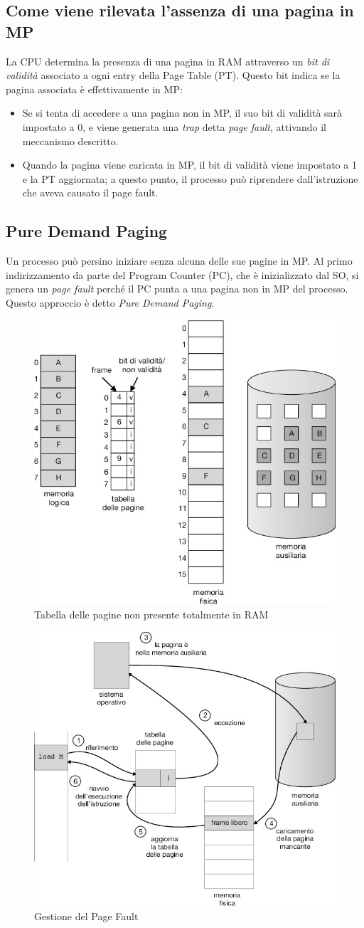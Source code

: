 \subsection*{Come viene rilevata l'assenza di una pagina in MP}
La CPU determina la presenza di una pagina in RAM attraverso un \emph{bit di validità} associato a ogni entry della Page Table (PT). Questo bit indica se la pagina associata è effettivamente in MP:
\begin{itemize}
    \item Se si tenta di accedere a una pagina non in MP, il suo bit di validità sarà impostato a 0, e viene generata una \emph{trap} detta \emph{page fault}, attivando il meccanismo descritto.
    \item Quando la pagina viene caricata in MP, il bit di validità viene impostato a 1 e la PT aggiornata; a questo punto, il processo può riprendere dall'istruzione che aveva causato il page fault.
\end{itemize}
\subsection*{Pure Demand Paging}
Un processo può persino iniziare senza alcuna delle sue pagine in MP. Al primo indirizzamento da parte del Program Counter (PC), che è inizializzato dal SO, si genera un \emph{page fault} perché il PC punta a una pagina non in MP del processo. Questo approccio è detto \emph{Pure Demand Paging}.

\begin{figure}[h] \centering \includegraphics[width=0.25\linewidth]{images/table_of_pages_notAllInRam.png} \caption{Tabella delle pagine non presente totalmente in RAM} \label{fig:10.4} \end{figure}
\begin{figure}[h] \centering \includegraphics[width=0.25\linewidth]{images/page_fault_gestion.png} \caption{Gestione del Page Fault} \label{fig:10.5} \end{figure}

